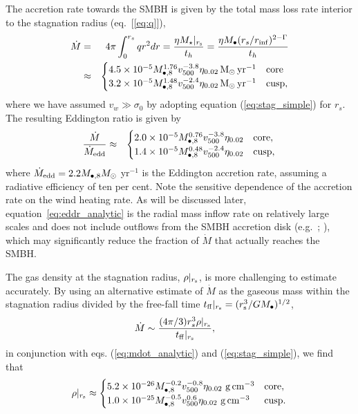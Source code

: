 \documentclass[usenatbib,fleqn]{mn2e}
\newcommand{\rs}{r_s}
\newcommand{\Mbh}[1][]{M_{\bullet#1}}
\newcommand{\Mbheight}{M_{\bullet,8}}
\newcommand{\rinf}{r_{\rm inf}}
\newcommand{\pyear}{{\rm yr}^{-1}}
\renewcommand{\th}{t_h}
\newcommand{\tff}{t_{\rm ff}}
\begin{document}
The accretion rate towards the SMBH is given by the total mass loss rate interior to the stagnation radius (eq.~[\ref{eq:q}]), 
\begin{eqnarray}
  \dot{M} &=& 4\pi \int_{0}^{r_{s}}q r^{2}dr = \frac{\eta
    M_{\star}|_{r_{\rm s}}}{\th} = \frac{\eta \Mbh (\rs/\rinf)^{2-\Gamma}}{\th} \nonumber \\
  &\approx&
  \begin{cases}
    4.5 \times 10^{-5} M_{\bullet,8}^{1.76}
    v_{500}^{-3.8}  \eta_{0.02} \Msun \, \pyear& \text{core} \\
    3.2 \times 10^{-5} M_{\bullet,8}^{1.48} 
    v_{500}^{-2.4}  \eta_{0.02} \Msun \, \pyear  & \text{cusp}, 
  \end{cases}
  \label{eq:mdot_analytic}            
\end{eqnarray}
where we have assumed $v_{w} \gg \sigma_0$ by adopting equation
(\ref{eq:stag_simple}) for $r_s$.  The resulting Eddington ratio is
given by
\begin{eqnarray}
\frac{\dot{M}}{\dot{M}_{\rm edd}} &\approx&
  \begin{cases}
    2.0 \times 10^{-5} M_{\bullet,8}^{0.76}
    v_{500}^{-3.8}  \eta_{0.02}   & \text{core}, \\
    1.4 \times 10^{-5} \Mbheight^{0.48} 
    v_{500}^{-2.4}  \eta_{0.02}   & \text{cusp}, 
  \end{cases}
  \label{eq:eddr_analytic}
\end{eqnarray}
where $\dot{M}_{\rm edd} = 2.2M_{\bullet,8}M_{\odot}$ yr$^{-1}$ is the
Eddington accretion rate, assuming a radiative efficiency of ten per
cent.  Note the sensitive dependence of the accretion rate on the wind
heating rate.  As will be discussed later,
equation~\eqref{eq:eddr_analytic} is the radial mass inflow rate on
relatively large scales and does not include outflows from the SMBH
accretion disk (e.g.~\citealt{Blandford&Begelman99}; \citealt{Li+13}),
which may significantly reduce the fraction of $\dot{M}$ that actually
reaches the SMBH.

The gas density at the stagnation radius, $\rho|_{r_{\rm s}}$, is more
challenging to estimate accurately.  By using an alternative estimate of
$\dot{M}$ as the gaseous mass within the stagnation radius divided by
the free-fall time $t_{\rm ff}|_{r_{\rm s}} = (r_{\rm
  s}^{3}/GM_{\bullet})^{1/2}$,
\begin{align}
  &\dot{M}\sim\frac{(4 \pi/3) \rs^3 \rho|_{r_{\rm s}}}{\tff|_{r_{\rm s}}},
  \label{eq:mdot_gas}
\end{align}
 in conjunction with eqs. (\ref{eq:mdot_analytic}) and (\ref{eq:stag_simple}), we find that
\begin{align}
  \rho|_{r_{\rm s}}\approx
  \begin{cases}
    5.2 \times 10^{-26} \Mbheight^{-0.2} v_{500}^{-0.8}  \eta_{0.02} \,
    \, {\rm g \, cm^{-3}}& \text{core},\\
    1.0 \times 10^{-25}  \Mbheight^{-0.5} v_{500}^{0.6}  \eta_{0.02} \,\, {\rm g \,cm^{-3}} & \text{cusp}.
  \end{cases}
  \label{eq:rhors}
\end{align}
\end{document}
